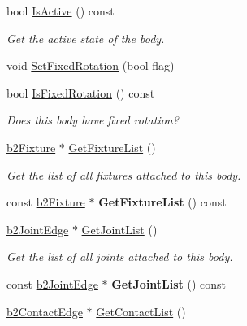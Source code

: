 \begin{DoxyCompactItemize}
bool \hyperlink{classb2_body_a825f37f457d3674ace96e2b8a9b4cae6}{Is\+Active} () const
\begin{DoxyCompactList}\small\item\em Get the active state of the body. \end{DoxyCompactList}\item 
void \hyperlink{classb2_body_aff35078e2a221d2d05409674936cb8d2}{Set\+Fixed\+Rotation} (bool flag)
\item 
\mbox{\label{classb2_body_a0920b7a770f7c876cf6d149e227036b5}} 
bool \hyperlink{classb2_body_a0920b7a770f7c876cf6d149e227036b5}{Is\+Fixed\+Rotation} () const
\begin{DoxyCompactList}\small\item\em Does this body have fixed rotation? \end{DoxyCompactList}\item 
\mbox{\label{classb2_body_a64634da20c6e0ab2d68a3cc9ea15efc3}} 
\hyperlink{classb2_fixture}{b2\+Fixture} $\ast$ \hyperlink{classb2_body_a64634da20c6e0ab2d68a3cc9ea15efc3}{Get\+Fixture\+List} ()
\begin{DoxyCompactList}\small\item\em Get the list of all fixtures attached to this body. \end{DoxyCompactList}\item 
\mbox{\label{classb2_body_ae232293cb940477443434c5e846607e3}} 
const \hyperlink{classb2_fixture}{b2\+Fixture} $\ast$ {\bfseries Get\+Fixture\+List} () const
\item 
\mbox{\label{classb2_body_a55cf2eb851780599ca5c1f6f25a17e41}} 
\hyperlink{structb2_joint_edge}{b2\+Joint\+Edge} $\ast$ \hyperlink{classb2_body_a55cf2eb851780599ca5c1f6f25a17e41}{Get\+Joint\+List} ()
\begin{DoxyCompactList}\small\item\em Get the list of all joints attached to this body. \end{DoxyCompactList}\item 
\mbox{\label{classb2_body_a3e581c94ae0fbc4e1083bf6ed8c0f0a9}} 
const \hyperlink{structb2_joint_edge}{b2\+Joint\+Edge} $\ast$ {\bfseries Get\+Joint\+List} () const
\item 
\hyperlink{structb2_contact_edge}{b2\+Contact\+Edge} $\ast$ \hyperlink{classb2_body_a16bdbfb266c82a0ef51be351a8928bc5}{Get\+Contact\+List} ()

\end{DoxyCompactItemize}
